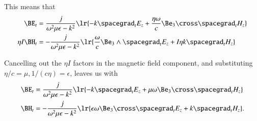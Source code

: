 {This means that
\begin{equation}\label{eqn:transverseFieldProblems:380}
\begin{aligned}
\BE_t &= \frac{j}{\omega^2 \mu \epsilon - k^2 } \lr{ -k \spacegrad_t E_z + \frac{\eta \omega}{c} \Be_3 \cross \spacegrad_t H_z } \\
\eta I \BH_t &= -\frac{j}{\omega^2 \mu \epsilon - k^2 } \lr{ \frac{\omega}{c} \Be_3 \wedge \spacegrad_t E_z + I \eta k \spacegrad_t H_z }
\end{aligned}
\end{equation}

Cancelling out the \( \eta I \) factors in the magnetic field component, and substituting \( \eta/c = \mu, 1/(c\eta) = \epsilon \), leaves us with
\begin{equation}\label{eqn:transverseFieldProblems:400}
\begin{aligned}
\BE_t &= \frac{j}{\omega^2 \mu \epsilon - k^2 } \lr{ -k \spacegrad_t E_z + \mu \omega \Be_3 \cross \spacegrad_t H_z } \\
\BH_t &= -\frac{j}{\omega^2 \mu \epsilon - k^2 } \lr{ \epsilon \omega \Be_3 \cross \spacegrad_t E_z + k \spacegrad_t H_z }.
\end{aligned}
\end{equation}
} %
